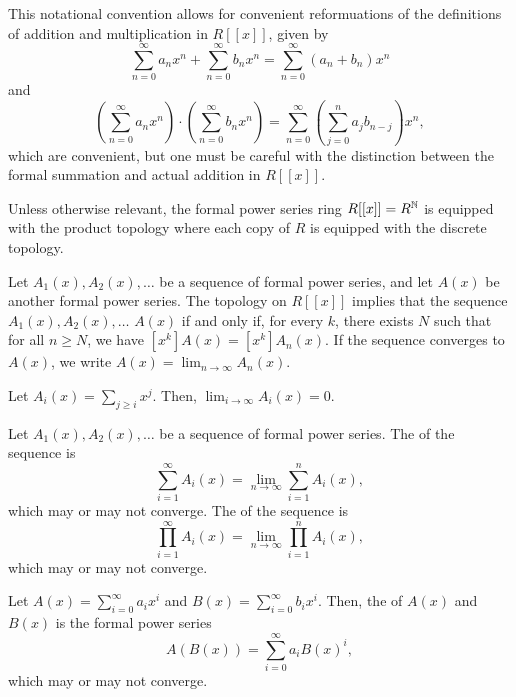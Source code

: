 This notational convention allows for convenient reformuations of the definitions of addition and multiplication in \(R[[x]]\), given by
\begin{equation}
    \sum_{n=0}^\infty a_n x^n + \sum_{n=0}^\infty b_n x^n = \sum_{n=0}^\infty (a_n + b_n) x^n
\end{equation}
and
\begin{equation}
    \left( \sum_{n=0}^\infty a_n x^n \right) \cdot \left( \sum_{n=0}^\infty b_n x^n \right) = \sum_{n=0}^\infty \left( \sum_{j=0}^n a_j b_{n-j} \right) x^n,
\end{equation}
which are convenient, but one must be careful with the distinction between the formal summation and actual addition in \(R[[x]]\).

Unless otherwise relevant, the formal power series ring \(R[[x]] = R^{\mathbb{N}}\) is equipped with the product topology where each copy of \(R\) is equipped with the discrete topology.

Let \(A_1(x), A_2(x), \dots\) be a sequence of formal power series,
and let \(A(x)\) be another formal power series.
The topology on \(R[[x]]\) implies that
the sequence \(A_1(x), A_2(x), \dots\)  \(A(x)\)
if and only if,
for every \(k\),
there exists \(N\) such that
for all \(n \geq N\),
we have \([x^k] A(x) = [x^k] A_n(x)\).
If the sequence converges to \(A(x)\),
we write \(A(x) = \lim_{n \to \infty} A_n(x)\).

\begin{example}
    Let \(A_i(x) = \sum_{j \geq i} x^j\).
    Then, \(\lim_{i \to \infty} A_i(x) = 0\).
\end{example}

Let \(A_1(x), A_2(x), \dots\) be a sequence of formal power series.
The  of the sequence is
\begin{equation}
    \sum_{i=1}^\infty A_i(x) = \lim_{n \to \infty} \sum_{i=1}^n A_i(x),
\end{equation}
which may or may not converge.
The  of the sequence is
\begin{equation}
    \prod_{i=1}^\infty A_i(x) = \lim_{n \to \infty} \prod_{i=1}^n A_i(x),
\end{equation}
which may or may not converge.

Let \(A(x) = \sum_{i=0}^\infty a_i x^i\) and \(B(x) = \sum_{i=0}^\infty b_i x^i\).
Then, the  of \(A(x)\) and \(B(x)\) is the formal power series
\begin{equation}
    A(B(x)) = \sum_{i=0}^\infty a_i B(x)^i,
\end{equation}
which may or may not converge.

